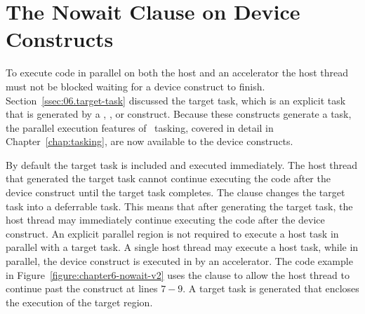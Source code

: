 \section{The Nowait Clause on Device Constructs}
\label{sec:06.async-exec}


To execute code in parallel on both the host and an
accelerator the host thread must not be blocked waiting for a
device construct to finish.  Section~\ref{ssec:06.target-task} discussed the
target task, which is an explicit task that is generated by a ,
,  or 
construct.  Because these constructs generate a task, the parallel execution
features of \OMP\ tasking, covered in detail in Chapter~\ref{chap:tasking}, are
now available to the device constructs.

By default the target task is included and executed immediately.  The host
thread that generated the target task cannot continue executing the code after
the device construct until the target task completes.  The  clause
changes the target task into a deferrable task.  This means that after
generating the target task, the host thread may immediately continue executing
the code after the device construct.  An explicit parallel region is not
required to execute a host task in parallel with a target task.  A single host
thread may execute a host task, while in parallel, the device construct is executed in
by an accelerator.  The code example in
Figure~\ref{figure:chapter6-nowait-v2} uses the  clause to allow the
host thread to continue past the  construct at lines $7-9$.  A
target task is generated that encloses the execution of the target region.

